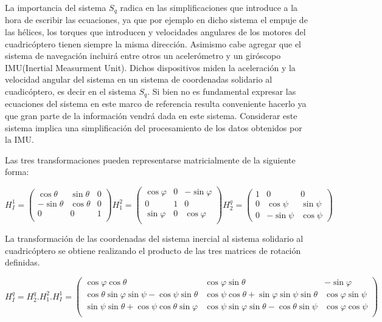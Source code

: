 \documentclass[main]{subfiles}
\begin{document}
La importancia del sistema $S_q$ radica en las simplificaciones que introduce a la hora de escribir las ecuaciones, ya que por ejemplo en dicho sistema el empuje de las h\'elices, los torques que introducen y velocidades angulares de los motores del cuadric\'optero tienen siempre la misma direcci\'on. Asimismo cabe agregar que el sistema de navegaci\'on incluir\'a entre otros un aceler\'ometro y un gir\'oscopo IMU(Inertial Measurment Unit). Dichos dispositivos miden la aceleraci\'on y la velocidad angular del sistema en un sistema de coordenadas solidario al cuadic\'optero, es decir en el sistema $S_q$. Si bien no es fundamental expresar las ecuaciones del sistema en este marco de referencia resulta conveniente hacerlo ya que gran parte de la informaci\'on vendr\'a dada en este sistema. Considerar este sistema implica una simplificaci\'on del procesamiento de los datos obtenidos por la IMU. 

Las tres transformaciones pueden representarse matricialmente de la siguiente forma: 

\begin{equation}
\label{eq:bases}
H_I^1=\left(\begin{array}{ccc}
  \cos\theta&\sin\theta&0\\
  -\sin\theta&\cos\theta&0\\
  0&0&1\\
  \end{array}\right)   H_1^2=\left(\begin{array}{ccc}
  \cos\varphi&0& -\sin\varphi\\
  0&1&0\\
  \sin\varphi&0&\cos\varphi\\
  
  \end{array}\right)  H_2^q=\left(\begin{array}{ccc}
   1&0&0\\  
  0&\cos\psi&\sin\psi\\
  0&-\sin\psi&\cos\psi  
  
  \end{array}\right) 
\end{equation}



La transformaci\'on de las coordenadas del sistema inercial al sistema solidario al cuadric\'optero se obtiene realizando el producto de las tres matrices de rotaci\'on definidas.

\begin{footnotesize}
$$
H_I^q=H_2^q.H_1^2.H_I^1=\left(\begin{array}{ccc}
\cos\varphi\cos\theta& \cos\varphi\sin\theta& -\sin\varphi\\
 \cos\theta\sin\varphi\sin\psi -\cos\psi\sin\theta &\cos \psi \cos \theta+ \sin\varphi\sin\psi\sin\theta& \cos\varphi\sin\psi\\
\sin\psi\sin\theta + \cos\psi\cos\theta\sin\varphi&  \cos\psi\sin\varphi\sin\theta- \cos\theta\sin\psi & \cos\varphi\cos\psi\\
\end{array} \right)
$$
\end{footnotesize}
 
\end{document}

